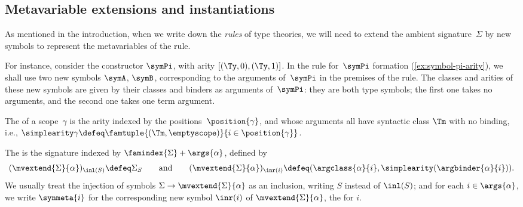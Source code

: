 \subsection{Metavariable extensions and instantiations}
\label{sec:metas-and-instantiations}

As mentioned in the introduction, when we write down the \emph{rules} of type theories, we will need to extend the ambient signature~$\Sigma$ by new symbols to represent the metavariables of the rule.

For instance, consider the constructor $\symPi$, with arity $[(\Ty,0),(\Ty,1)]$.
%
In the rule for~$\symPi$ formation (\cref{ex:symbol-pi-arity}), we shall use two new symbols $\symA$, $\symB$, corresponding to the arguments of~$\symPi$ in the premises of the rule.
%
The classes and arities of these new symbols are given by their classes and binders as arguments of~$\symPi$: they are both type symbols; the first one takes no arguments, and the second one takes one term argument.

\begin{definition}
  \label{def:simple-arity}%
  The  of a scope~$\gamma$ is the arity indexed by the positions~$\position{\gamma}$, and whose arguments all have syntactic class $\Tm$ with no binding, i.e., $\simplearity \gamma \defeq \famtuple{(\Tm, \emptyscope)}{i \in \position{\gamma}}$.
\end{definition}

\begin{definition}
  \label{def:metavariable-extensions}%
  The  is the signature indexed by $\famindex{\Sigma} + \args{\alpha}$, defined by
  \begin{equation*}
    (\mvextend{\Sigma}{\alpha})_{\inl(S)} \defeq \Sigma_S
    \qquad\text{and}\qquad
    (\mvextend{\Sigma}{\alpha})_{\inr(i)} \defeq (\argclass{\alpha}{i}, \simplearity (\argbinder{\alpha}{i})).
  \end{equation*}
  We usually treat the injection of symbols $\Sigma \to \mvextend{\Sigma}{\alpha}$ as an inclusion, writing $S$ instead of $\inl(S)$;
  and for each $i \in \args{\alpha}$, we write $\synmeta{i}$ for the corresponding new symbol $\inr(i)$ of $\mvextend{\Sigma}{\alpha}$, the  for $i$.
\end{definition}

